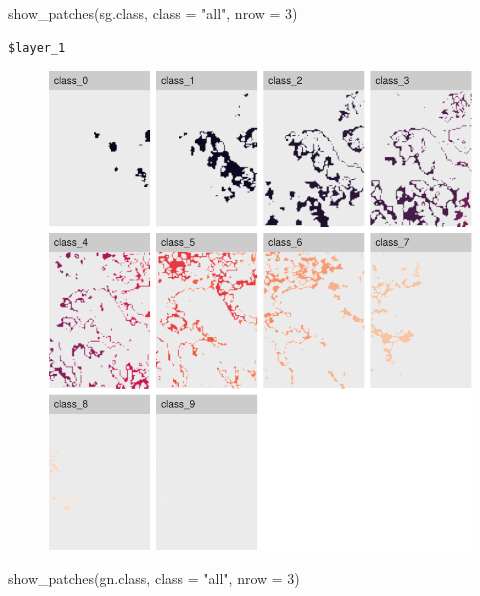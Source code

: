 \documentclass[
  letterpaper,
  DIV=11,
  numbers=noendperiod]{scrartcl}
\newenvironment{Shaded}{\begin{snugshade}}{\end{snugshade}}
\newcommand{\AttributeTok}[1]{\textcolor[rgb]{0.40,0.45,0.13}{#1}}
\newcommand{\DecValTok}[1]{\textcolor[rgb]{0.68,0.00,0.00}{#1}}
\newcommand{\FunctionTok}[1]{\textcolor[rgb]{0.28,0.35,0.67}{#1}}
\newcommand{\NormalTok}[1]{\textcolor[rgb]{0.00,0.23,0.31}{#1}}
\newcommand{\StringTok}[1]{\textcolor[rgb]{0.13,0.47,0.30}{#1}}
\begin{document}
\begin{Shaded}
\begin{Highlighting}[]
\FunctionTok{show\_patches}\NormalTok{(sg.class, }\AttributeTok{class =} \StringTok{"all"}\NormalTok{, }\AttributeTok{nrow =} \DecValTok{3}\NormalTok{)}
\end{Highlighting}
\end{Shaded}

\begin{verbatim}
$layer_1
\end{verbatim}

\begin{figure}[H]

{\centering \includegraphics{PatternAnalysisWorkshopTutorial_files/figure-pdf/show.patches.all-1.pdf}

}

\end{figure}

\begin{Shaded}
\begin{Highlighting}[]
\FunctionTok{show\_patches}\NormalTok{(gn.class, }\AttributeTok{class =} \StringTok{"all"}\NormalTok{, }\AttributeTok{nrow =} \DecValTok{3}\NormalTok{)}
\end{Highlighting}
\end{Shaded}
\end{document}
